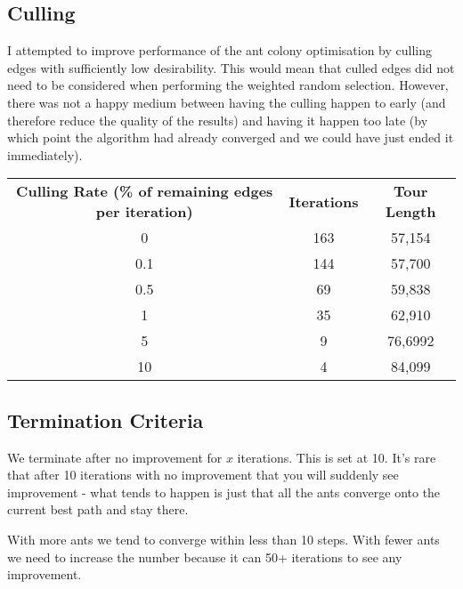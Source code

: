 \documentclass[a4paper, 11pt,table]{article}
\begin{document}
	\subsection{Culling}
	I attempted to improve performance of the ant colony optimisation by culling edges with sufficiently low desirability. This would mean that culled edges did not need to be considered when performing the weighted random selection. However, there was not a happy medium between having the culling happen to early (and therefore reduce the quality of the results) and having it happen too late (by which point the algorithm had already converged and we could have just ended it immediately).
	
	\begin{center}
		\begin{tabu}{|c c c|}
			\textbf{Culling Rate (\% of remaining edges per iteration)} & \textbf{Iterations} & \textbf{Tour Length} \\
			0                                                           & 163                 & 57,154               \\
			0.1                                                         & 144                 & 57,700               \\
			0.5                                                         & 69                  & 59,838               \\
			1                                                           & 35                  & 62,910               \\
			5                                                           & 9                   & 76,6992              \\
			10                                                          & 4                   & 84,099               \\
		\end{tabu}
	\end{center}
	
	\subsection{Termination Criteria}
	We terminate after no improvement for $x$ iterations. This is set at 10. It's rare that after 10 iterations with no improvement that you will suddenly see improvement - what tends to happen is just that all the ants converge onto the current best path and stay there.
	
	With more ants we tend to converge within less than 10 steps. With fewer ants we need to increase the number because it can 50+ iterations to see any improvement.
	
\end{document}
